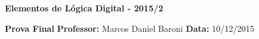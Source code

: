 \documentclass[12pt]{article}
\begin{document}

\begin{center}
{\Large \bf Elementos de Lógica Digital - 2015/2}
\end{center}
{\large \bf Prova Final}
{\bf Professor:} Marcos Daniel Baroni
{\bf Data:} 10/12/2015

\end{document}
